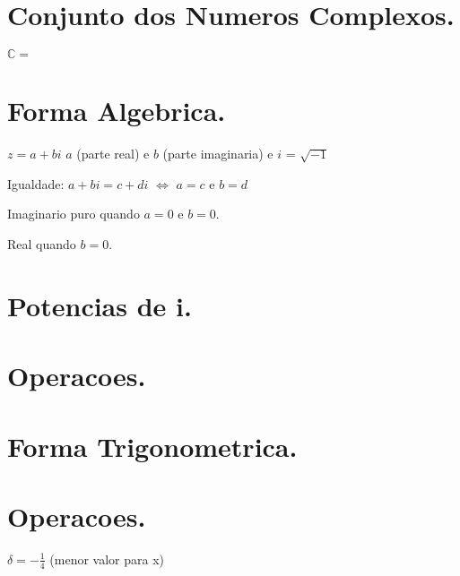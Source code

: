 \documentclass[a4paper,12pt]{article}
\begin{document}
\section {Conjunto dos Numeros Complexos.}

$\mathbb{C} = $

\section {Forma Algebrica.}

$z = a + bi$
$a$ (parte real) e $b$ (parte imaginaria) e $i$ = $\sqrt{-1}$

Igualdade: $a + bi = c +di$ $\Leftrightarrow$ $a = c$ e $b = d$

Imaginario puro quando $a = 0$ e $b = 0$.

Real quando $b = 0$.

\section {Potencias de i.}

\section {Operacoes.}

\section {Forma Trigonometrica.}

\section {Operacoes.}


$\delta = -\frac{1}{4}$ (menor valor para x)
\end{document}
